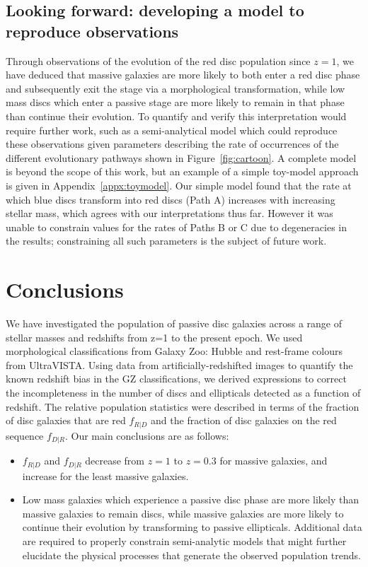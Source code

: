 \documentclass[useAMS,usenatbib]{mn2e}
\begin{document}
\subsection{Looking forward: developing a model to reproduce observations}

Through observations of the evolution of the red disc population since $z=1$, we have deduced that massive galaxies are more likely to both enter a red disc phase and subsequently exit the stage via a morphological transformation, while low mass discs which enter a passive stage are more likely to remain in that phase than continue their evolution. To quantify and verify this interpretation would require further work, such as a semi-analytical model which could reproduce these observations given parameters describing the rate of occurrences of the different evolutionary pathways shown in Figure~\ref{fig:cartoon}. A complete model is beyond the scope of this work, but an example of a simple toy-model approach is given in Appendix~\ref{appx:toymodel}. Our simple model found that the rate at which blue discs transform into red discs (Path A) increases with increasing stellar mass, which agrees with our interpretations thus far. However it was unable to constrain values for the rates of Paths B or C due to degeneracies in the results; constraining all such parameters is the subject of future work.


\section{Conclusions}
\label{sec:conclusions}

We have investigated the population of passive disc galaxies across a range of stellar masses and redshifts from z=1 to the present epoch. We used morphological classifications from Galaxy Zoo: Hubble and rest-frame colours from UltraVISTA. Using data from artificially-redshifted  images to quantify the known redshift bias in the GZ classifications, we derived expressions to correct the incompleteness in the number of discs and ellipticals detected as a function of redshift. The relative population statistics were described in terms of the fraction of disc galaxies that are red $f_{R|D}$ and the fraction of disc galaxies on the red sequence $f_{D|R}$. Our main conclusions are as follows:

\begin{itemize}

\item{$f_{R|D}$ and $f_{D|R}$ decrease from $z=1$ to $z=0.3$ for massive galaxies, and increase for the least massive galaxies.}

\item{Low mass galaxies which experience a passive disc phase are more likely than massive galaxies to remain discs, while massive galaxies are more likely to continue their evolution by transforming to passive ellipticals. Additional data are required to properly constrain semi-analytic models that might further elucidate the physical processes that generate the observed population trends.}


\end{itemize}
\end{document}
